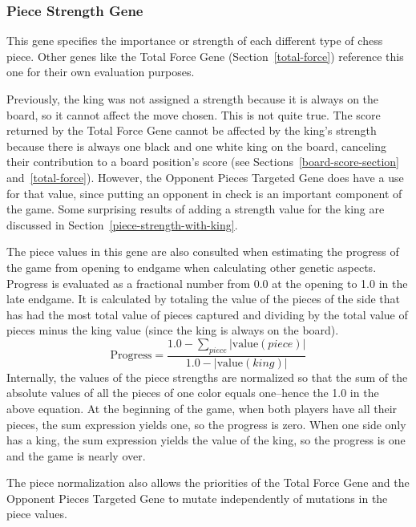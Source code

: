 \documentclass[letterpaper]{article}
\renewcommand{\_}{\allowbreak\textunderscore\allowbreak}
\begin{document}
\subsubsection{Piece Strength Gene}\label{piece-strength}
This gene specifies the importance or strength of each different type of chess piece. Other genes like the Total Force Gene (Section~\ref{total-force}) reference this one for their own evaluation purposes.

Previously, the king was not assigned a strength because it is always on the board, so it cannot affect the move chosen. This is not quite true. The score returned by the Total Force Gene cannot be affected by the king's strength because there is always one black and one white king on the board, canceling their contribution to a board position's score (see Sections~\ref{board-score-section} and~\ref{total-force}). However, the Opponent Pieces Targeted Gene does have a use for that value, since putting an opponent in check is an important component of the game. Some surprising results of adding a strength value for the king are discussed in Section~\ref{piece-strength-with-king}.

The piece values in this gene are also consulted when estimating the progress of the game from opening to endgame when calculating other genetic aspects. Progress is evaluated as a fractional number from 0.0 at the opening to 1.0 in the late endgame. It is calculated by totaling the value of the pieces of the side that has had the most total value of pieces captured and dividing by the total value of pieces minus the king value (since the king is always on the board).
\[
\textrm{Progress} = \frac{1.0 - \sum_{piece} |\textrm{value}(piece)|}{1.0 - |\textrm{value}(king)|}
\]
Internally, the values of the piece strengths are normalized so that the sum of the absolute values of all the pieces of one color equals one--hence the 1.0 in the above equation. At the beginning of the game, when both players have all their pieces, the sum expression yields one, so the progress is zero. When one side only has a king, the sum expression yields the value of the king, so the progress is one and the game is nearly over.

The piece normalization also allows the priorities of the Total Force Gene and the Opponent Pieces Targeted Gene to mutate independently of mutations in the piece values.
\end{document}
